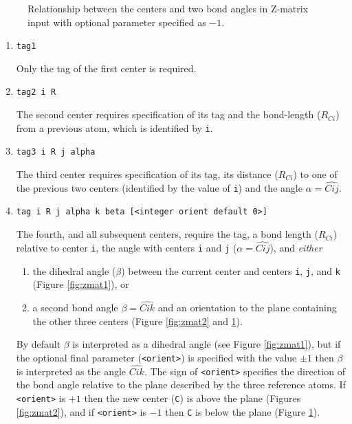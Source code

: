 \begin{figure}[htbp]
\centering
{}

\caption{\label{fig:zmat3} Relationship between the centers and two
  bond angles in Z-matrix input with optional parameter specified as $-1$.}
\end{figure}

\begin{enumerate}

   \item \verb+tag1+

   Only  the  tag  of the first center is required.

   \item \verb+tag2 i R+

     The second center requires specification of its tag and the
     bond-length ($R_{Ci}$) from a previous atom, which is identified by
     \verb+i+.

   \item \verb+tag3 i R j alpha+

     The third center requires specification of its tag, its distance
     ($R_{Ci}$) to one of the previous two centers (identified by the
     value of \verb+i+) and the angle $\alpha = \widehat{Cij}$.

   \item \verb+tag i R j alpha k beta [<integer orient default 0>]+

     The fourth, and all subsequent centers, require the tag, a bond
     length ($R_{Ci}$) relative to center \verb+i+, the angle with
     centers \verb+i+ and \verb+j+ ($\alpha = \widehat{Cij}$), and {\em either} 
    \begin{enumerate}
    \item the dihedral angle ($\beta$) between the current center and centers
      \verb+i+, \verb+j+, and \verb+k+ (Figure \ref{fig:zmat1}), or
      \item  a second bond angle $\beta = \widehat{Cik}$ and an orientation to 
      the plane containing the other three centers (Figure
      \ref{fig:zmat2} and \ref{fig:zmat3}).
    \end{enumerate}

    By default $\beta$ is interpreted as a dihedral angle (see Figure
    \ref{fig:zmat1}), but if the optional final parameter (\verb+<orient>+) is
    specified with the value $\pm 1$ then $\beta$ is interpreted as
    the angle $\widehat{Cik}$.  The sign of \verb+<orient>+ specifies the
    direction of the bond angle relative to the plane described by the
    three reference atoms.  If \verb+<orient>+ is $+1$ then the new center
    (\verb+C+) is above the plane (Figures \ref{fig:zmat2}), and if
    \verb+<orient>+ is $-1$ then \verb+C+ is below the plane (Figure
    \ref{fig:zmat3}).
\end{enumerate}

